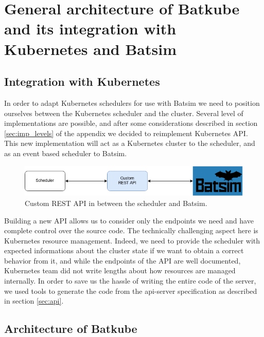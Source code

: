 \section{General architecture of Batkube and its integration with Kubernetes and Batsim}

\subsection{Integration with Kubernetes}

In order to adapt Kubernetes schedulers for use with Batsim we need to position
ourselves between the Kubernetes scheduler and the cluster. Several level of
implementations are possible, and after some considerations described in
section \ref{sec:imp_levels} of the appendix we decided to reimplement
Kubernetes API. This new implementation will act as a Kubernetes cluster to the
scheduler, and as an event based scheduler to Batsim.

\begin{figure}[h]
	\centering
	\includegraphics[width=\textwidth]{imgs/custom-restapi.png}
	\caption{Custom REST API in between the scheduler and Batsim.}
	\label{fig:custom-api}
\end{figure}

Building a new API allows us to consider only the endpoints we need and have
complete control over the source code. The technically challenging aspect here
is Kubernetes resource management. Indeed, we need to provide the scheduler
with expected informations about the cluster state if we want to obtain a
correct behavior from it, and while the endpoints of the API are well
documented, Kubernetes team did not write lengths about how resources are
managed internally. In order to save us the hassle of writing the entire code
of the server, we used tools to generate the code from the api-server
specification as described in section \ref{sec:api}.

\subsection{Architecture of Batkube}

